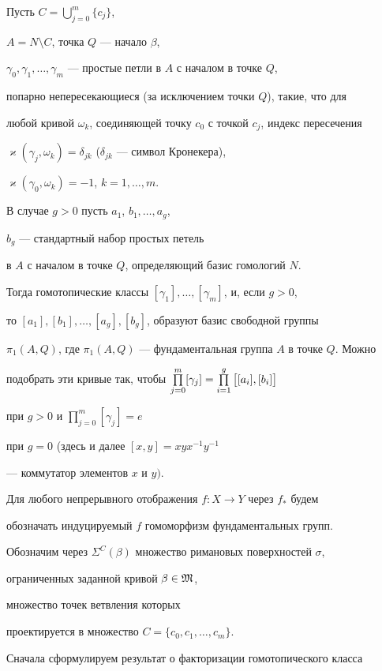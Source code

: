 Пусть $C=\bigcup_{j=0}^m \{c_j\}$,


$A=N\setminus C$, точка $Q$ --- начало $\beta$,


$\gamma_0,\gamma_1,\dotsc,\gamma_m$ --- простые петли в $A$ с началом в точке $Q$, 


попарно непересекающиеся (за исключением точки $Q$), такие, что для


любой кривой $\omega_k$, соединяющей точку $c_0$ с точкой $c_j$, индекс пересечения


$\varkappa(\gamma_j,\omega_k)=\delta_{jk}$ ($\delta_{jk}$ --- символ Кронекера),


$\varkappa(\gamma_0,\omega_k)=-1$, $k=1,\dotsc,m$.


В случае $g >0$ пусть $a_1$, $b_1,\dotsc,a_g$,


$b_g$ --- стандартный набор простых петель


в $A$ с началом в точке $Q$, определяющий базис гомологий $N$.


Тогда гомотопические классы $[\gamma_1],\dotsc,[\gamma_m]$, и, если $g>0$,


то $[a_1],[b_1],\dotsc,[a_g],[b_g]$, образуют базис свободной группы 


$\pi_1(A,Q)$, где $\pi_1(A,Q)$ --- фундаментальная группа $A$ в точке $Q$. Можно


подобрать эти кривые так, чтобы $\PL_{j=0}^m


[\gamma_j]=\PL_{i=1}^g\big[[a_i],[b_i]\big]$ 


при $g>0$ и $\prod_{{j=0}}^m [\gamma_{{j}}]=e$


при $g=0$ (здесь и далее $[x,y]=xyx^{{-1}} y^{{-1}} $


--- коммутатор элементов $x$ и $y)$.





Для любого непрерывного отображения $f:X\to Y$ через $f_{\ast} $ будем


обозначать индуцируемый $f$ гомоморфизм фундаментальных групп.





Обозначим через $\Sigma^{C}(\beta)$ множество римановых поверхностей $\sigma$, 


ограниченных заданной кривой $\beta\in\frak M$,


множество точек ветвления которых


проектируется в множество $C=\{c_0,c_1,\dotsc,c_m\}$.


Сначала сформулируем результат о факторизации гомотопического класса


